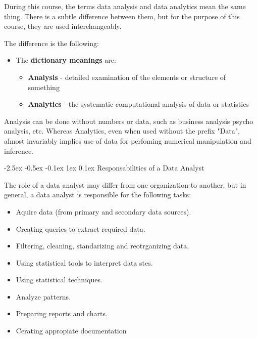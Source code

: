 \documentclass[12pt]{report}
\makeatletter
\renewcommand{\section}{\@startsection{section}{1}{\z@}%
  {-2.5ex \@plus -0.5ex \@minus -0.1ex}%
  {1ex \@plus 0.1ex}%
  {\normalfont\Large\sectionstyle}}
\newcommand{\sectionstyle}[1]{%
  \par\noindent\hrule
  \vspace{0.2ex}%
  {\scshape{#1}\par}%
  \vspace{0.4ex}%
  \hrule
}
\theoremstyle{largebreak}
\makeatother
\begin{document}
    \begin{obs}
        During this course, the terms data analysis and data analytics mean the same thing. There is a subtle difference between them, but for the purpose of this course, they are used interchangeably.

        The difference is the following:
        \begin{itemize}
            \item The \textbf{dictionary meanings} are:
            \begin{itemize}
                \item \textbf{Analysis} - detailed examination of the elements or structure of something
                \item \textbf{Analytics} - the systematic computational analysis of data or statistics
            \end{itemize}
        \end{itemize}
        Analysis can be done without numbers or data, such as business analysis psycho analysis, etc. Whereas Analytics, even when used without the prefix "Data", almost invariably implies use of data for perfoming numerical manipulation and inference. 
    \end{obs}

    \section{Responsabilities of a Data Analyst}

    The role of a data analyst may differ from one organization to another, but in general, a data analyst is responsible for the following tasks:
    \begin{itemize}
        \item Aquire data (from primary and secondary data sources).
        \item Creating queries to extract required data.
        \item Filtering, cleaning, standarizing and reotrganizing data.
        \item Using statistical tools to interpret data stes.
        \item Using statistical techniques.
        \item Analyze patterns.
        \item Preparing reports and charts.
        \item Cerating appropiate documentation
    \end{itemize}
\end{document}
